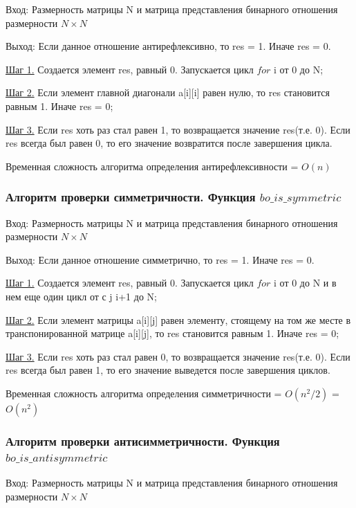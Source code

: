 \documentclass[bachelor, och, labwork]{shiza}
\begin{document}
	$\textit{Вход:}$ Размерность матрицы N и матрица представления бинарного отношения размерности $N \times N$
	
	$\textit{Выход:}$  Если данное отношение антирефлексивно, то res = 1. Иначе res = 0.
	
	\underline{Шаг 1.} Создается элемент res, равный 0. Запускается цикл $for$ i от 0 до N;
	
	\underline{Шаг 2.} Если элемент главной диагонали a[i][i] равен нулю, то res становится равным 1. Иначе res = 0;
	
	\underline{Шаг 3.} Если res хоть раз стал равен 1, то возвращается значение res(т.е. 0). Если res всегда был равен 0, то его значение возвратится после завершения цикла.
	
	Временная сложность алгоритма определения антирефлексивности = $O(n)$
		
	\subsubsection{Алгоритм проверки симметричности. Функция $bo\_is\_symmetric$}
	
	$\textit{Вход:}$ Размерность матрицы N и матрица представления бинарного отношения размерности $N \times N$
	
	$\textit{Выход:}$  Если данное отношение симметрично, то res = 1. Иначе res = 0.
	
	\underline{Шаг 1.} Создается элемент res, равный 0. Запускается цикл $for$ i от 0 до N и в нем еще один цикл от с j i+1 до N;
	
	\underline{Шаг 2.} Если элемент матрицы a[i][j] равен элементу, стоящему на том же месте в транспонированной матрице a[i][j], то res становится равным 1. Иначе res = 0;
	
	\underline{Шаг 3.} Если res хоть раз стал равен 0, то возвращается значение res(т.е. 0). Если res всегда был равен 1, то его значение выведется после завершения циклов.
	
	Временная сложность алгоритма определения симметричности = $O(n^2/2)$ = $O(n^2)$
	
	\subsubsection{Алгоритм проверки антисимметричности. Функция $bo\_is\_antisymmetric$}
	
	$\textit{Вход:}$ Размерность матрицы N и матрица представления бинарного отношения размерности $N \times N$
	
\end{document}
